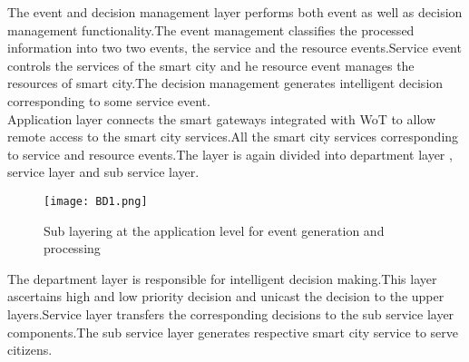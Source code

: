 \documentclass[10pt,a4paper,journal]{IEEEtran}
\begin{document}
\hspace{2em}The event and decision management layer performs both event as well as decision management functionality.The event management classifies the processed information into two two events, the service and the resource events.Service event controls the services of the smart city and he resource event manages the resources of smart city.The decision management generates intelligent decision corresponding to some service event.\\
\hspace{2em}Application layer connects the smart gateways integrated with WoT to allow remote access to the smart city services.All the smart city services corresponding to service and resource events.The layer is again divided into department layer , service layer and sub service layer.\\

\begin{figure}[htbp]
\centering
\texttt{[image: BD1.png]}
\caption{Sub layering at the application level for event generation and processing\cite{9}}
\label{2}
\end{figure}

\hspace{2em}The department layer is responsible for intelligent decision making.This layer ascertains high and low priority decision and unicast the decision to the upper layers.Service layer transfers the corresponding decisions to the sub service layer components.The sub service layer generates respective smart city service to serve citizens.\\
\end{document}
